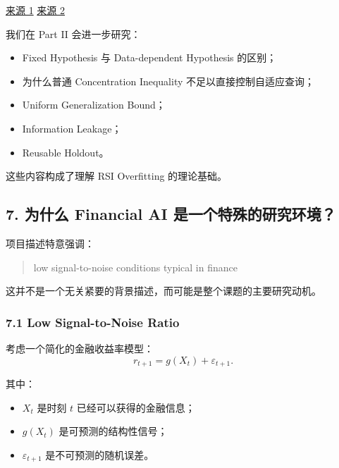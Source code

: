 \href{https://pubmed.ncbi.nlm.nih.gov/26250683/}{来源 1} \href{https://arxiv.org/abs/1506.02629}{来源 2}

我们在 Part II 会进一步研究：

\begin{itemize}
\tightlist
\item
  Fixed Hypothesis 与 Data-dependent Hypothesis 的区别；
\item
  为什么普通 Concentration Inequality 不足以直接控制自适应查询；
\item
  Uniform Generalization Bound；
\item
  Information Leakage；
\item
  Reusable Holdout。
\end{itemize}

这些内容构成了理解 RSI Overfitting 的理论基础。

\hypertarget{part-1-07-0001-ux4e3aux4ec0ux4e48-financial-ai-ux662fux4e00ux4e2aux7279ux6b8aux7684ux7814ux7a76ux73afux5883}{%
\subsection{7. 为什么 Financial AI 是一个特殊的研究环境？}\label{part-1-07-0001-ux4e3aux4ec0ux4e48-financial-ai-ux662fux4e00ux4e2aux7279ux6b8aux7684ux7814ux7a76ux73afux5883}}

项目描述特意强调：

\begin{quote}
low signal-to-noise conditions typical in finance
\end{quote}

这并不是一个无关紧要的背景描述，而可能是整个课题的主要研究动机。

\hypertarget{part-1-07-0001-low-signal-to-noise-ratio}{%
\subsubsection{7.1 Low Signal-to-Noise Ratio}\label{part-1-07-0001-low-signal-to-noise-ratio}}

考虑一个简化的金融收益率模型：
\[r_{t+1}=g(X_t)+\varepsilon_{t+1}.\]

其中：

\begin{itemize}
\tightlist
\item
  \(X_t\) 是时刻 \(t\) 已经可以获得的金融信息；
\item
  \(g(X_t)\) 是可预测的结构性信号；
\item
  \(\varepsilon_{t+1}\) 是不可预测的随机误差。
\end{itemize}

